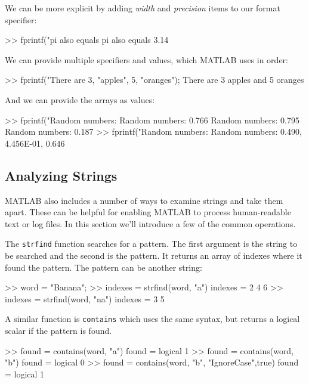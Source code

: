 \documentclass[../../book.tex]{subfiles}
\begin{document}
We can be more explicit by adding \emph{width} and \emph{precision} items to our format specifier:
\begin{code}
>> fprintf("pi also equals %
    pi also equals 3.14
\end{code}

We can provide multiple specifiers and values, which MATLAB uses in order:
\begin{code}
>> fprintf("There are %
3, "apples", 5, "oranges");
    There are 3 apples and 5 oranges
\end{code}

And we can provide the arrays as values:
\begin{code}
>> fprintf("Random numbers: %
Random numbers: 0.766
Random numbers: 0.795
Random numbers: 0.187
>> fprintf("Random numbers: %
Random numbers: 0.490, 4.456E-01, 0.646 
\end{code}




\subsection{Analyzing Strings}

MATLAB also includes a number of ways to examine strings and take them apart.  These can be helpful for enabling MATLAB to process human-readable text or log files.  In this section we'll introduce a few of the common operations.

The \lstinline{strfind} function searches for a pattern.  The first argument is the string to be searched and the second is the pattern.  It returns an array of indexes where it found the pattern. The pattern can be another string:
\begin{code}
>> word = "Banana";
>> indexes = strfind(word, "a")
    indexes =
         2     4     6
>> indexes = strfind(word, "na")
    indexes =
          3     5
\end{code}
A similar function is \lstinline{contains} which uses the same syntax, but returns a logical scalar if the pattern is found.
\begin{code}
>> found = contains(word, "a")
found =
  logical
   1
>> found = contains(word, "b")
found =
  logical
   0
>> found = contains(word, "b", "IgnoreCase",true)
found =
  logical
   1
\end{code}
\end{document}
